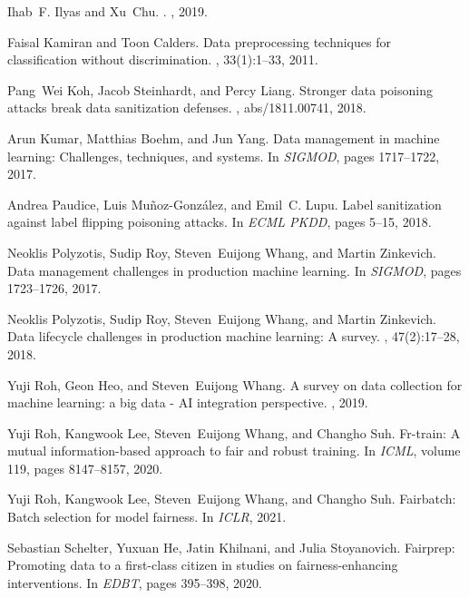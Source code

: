 \documentclass[11pt]{article}
\begin{document}
\begin{thebibliography}{10}
Ihab~F. Ilyas and Xu~Chu.
.
, 2019.

Faisal Kamiran and Toon Calders.
\newblock Data preprocessing techniques for classification without
  discrimination.
, 33(1):1--33, 2011.

Pang~Wei Koh, Jacob Steinhardt, and Percy Liang.
\newblock Stronger data poisoning attacks break data sanitization defenses.
, abs/1811.00741, 2018.

Arun Kumar, Matthias Boehm, and Jun Yang.
\newblock Data management in machine learning: Challenges, techniques, and
  systems.
\newblock In {\em SIGMOD}, pages 1717--1722, 2017.

Andrea Paudice, Luis Mu{\~{n}}oz{-}Gonz{\'{a}}lez, and Emil~C. Lupu.
\newblock Label sanitization against label flipping poisoning attacks.
\newblock In {\em ECML PKDD}, pages 5--15, 2018.

Neoklis Polyzotis, Sudip Roy, Steven~Euijong Whang, and Martin Zinkevich.
\newblock Data management challenges in production machine learning.
\newblock In {\em SIGMOD}, pages 1723--1726, 2017.

Neoklis Polyzotis, Sudip Roy, Steven~Euijong Whang, and Martin Zinkevich.
\newblock Data lifecycle challenges in production machine learning: {A} survey.
, 47(2):17--28, 2018.

Yuji Roh, Geon Heo, and Steven~Euijong Whang.
\newblock A survey on data collection for machine learning: a big data - {AI}
  integration perspective.
, 2019.

Yuji Roh, Kangwook Lee, Steven~Euijong Whang, and Changho Suh.
\newblock Fr-train: {A} mutual information-based approach to fair and robust
  training.
\newblock In {\em ICML}, volume 119, pages 8147--8157, 2020.

Yuji Roh, Kangwook Lee, Steven~Euijong Whang, and Changho Suh.
\newblock Fairbatch: Batch selection for model fairness.
\newblock In {\em ICLR}, 2021.

Sebastian Schelter, Yuxuan He, Jatin Khilnani, and Julia Stoyanovich.
\newblock Fairprep: Promoting data to a first-class citizen in studies on
  fairness-enhancing interventions.
\newblock In {\em EDBT}, pages 395--398, 2020.


\end{thebibliography}
\end{document}
